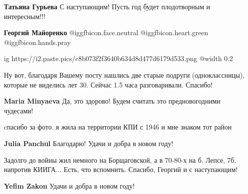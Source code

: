 \begin{itemize}
\begin{itemize} %
\textbf{Татьяна Гурьева} С наступающим! Пусть год будет плодотворным и интересным!!!

\textbf{Георгий Майоренко}  @igg{fbicon.face.neutral}  @igg{fbicon.heart.green}  @igg{fbicon.hands.pray} 
\end{itemize} %


\ifcmt
  ig https://i2.paste.pics/c8b073f2f3640b634d8d477d6179d533.png
  @width 0.2
\fi


Ну вот, благодаря Вашему посту нашлись две старые подруги (одноклассницы),
которые не виделись лет 30. Сейчас 1.5 часа разговаривали. Спасибо!

\begin{itemize} %
\textbf{Maria Minyaeva} Да, это здорово! Будем считать это предновогодними чудесами!
\end{itemize} %

cпасибо за фото. я жила на территории КПИ с 1946 и мне знаком тот район

\textbf{Julia Panchul} Благодарю! Удачи и добра в новом году!


Задолго до войны жил немного на Борщаговской, а в 70-80-х на б. Лепсе, 7б,
напротив КИИГА... Есть, что вспомнить. Спасибо, Георгий и с наступающим!

\textbf{Yefim Zakon} Удачи и добра в новом году!



\end{itemize} %
